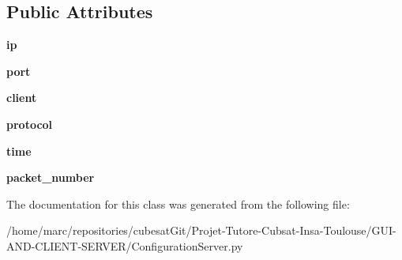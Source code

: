 \subsection*{Public Attributes}
\begin{DoxyCompactItemize}
\item 
\hypertarget{classConfigurationServer_1_1ConfigurationServer_af1cf7c8205196617538cda394c23dc36}{{\bfseries ip}}\label{classConfigurationServer_1_1ConfigurationServer_af1cf7c8205196617538cda394c23dc36}

\item 
\hypertarget{classConfigurationServer_1_1ConfigurationServer_a273ae6faff39e5c0e39670400389ee4d}{{\bfseries port}}\label{classConfigurationServer_1_1ConfigurationServer_a273ae6faff39e5c0e39670400389ee4d}

\item 
\hypertarget{classConfigurationServer_1_1ConfigurationServer_ae9dbf586052f3dab5622569ea91b92e0}{{\bfseries client}}\label{classConfigurationServer_1_1ConfigurationServer_ae9dbf586052f3dab5622569ea91b92e0}

\item 
\hypertarget{classConfigurationServer_1_1ConfigurationServer_a50803dd30c7d0b48acf6c7a34d3f5d8c}{{\bfseries protocol}}\label{classConfigurationServer_1_1ConfigurationServer_a50803dd30c7d0b48acf6c7a34d3f5d8c}

\item 
\hypertarget{classConfigurationServer_1_1ConfigurationServer_a8fa3da69a96d847f1234e36b0777993e}{{\bfseries time}}\label{classConfigurationServer_1_1ConfigurationServer_a8fa3da69a96d847f1234e36b0777993e}

\item 
\hypertarget{classConfigurationServer_1_1ConfigurationServer_ad781234144b1e02d5f7d2c57b02b676f}{{\bfseries packet\+\_\+number}}\label{classConfigurationServer_1_1ConfigurationServer_ad781234144b1e02d5f7d2c57b02b676f}

\end{DoxyCompactItemize}


The documentation for this class was generated from the following file\+:\begin{DoxyCompactItemize}
\item 
/home/marc/repositories/cubesat\+Git/\+Projet-\/\+Tutore-\/\+Cubsat-\/\+Insa-\/\+Toulouse/\+G\+U\+I-\/\+A\+N\+D-\/\+C\+L\+I\+E\+N\+T-\/\+S\+E\+R\+V\+E\+R/Configuration\+Server.\+py\end{DoxyCompactItemize}

